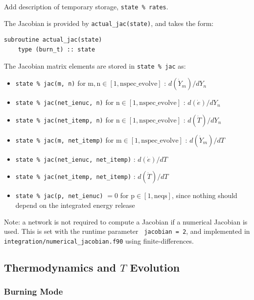 {\color{red} Add description of temporary storage, {\tt state \% rates}.}

The Jacobian is provided by {\tt actual\_jac(state)}, and takes the
form:
\begin{lstlisting}[language={[95]fortran}]
  subroutine actual_jac(state)
    type (burn_t) :: state
\end{lstlisting}
The Jacobian matrix elements are stored in {\tt state \% jac} as:
\begin{itemize}
\item {\tt state \% jac(m, n)} for $\mathrm{m}, \mathrm{n} \in [1, \mathrm{nspec\_evolve}]$ :
  $d(\dot{Y}_m)/dY_n$

\item {\tt state \% jac(net\_ienuc, n)} for $\mathrm{n} \in [1, \mathrm{nspec\_evolve}]$ :
  $d(\dot{e})/dY_n$

\item {\tt state \% jac(net\_itemp, n)} for $\mathrm{n} \in [1, \mathrm{nspec\_evolve}]$ :
  $d(\dot{T})/dY_n$

\item {\tt state \% jac(m, net\_itemp)} for $\mathrm{m} \in [1, \mathrm{nspec\_evolve}]$ :
  $d(\dot{Y}_m)/dT$

\item {\tt state \% jac(net\_ienuc, net\_itemp)} :
  $d(\dot{e})/dT$

\item {\tt state \% jac(net\_itemp, net\_itemp)} :
  $d(\dot{T})/dT$

\item {\tt state \% jac(p, net\_ienuc)} $= 0$ for $\mathrm{p} \in [1, \mathrm{neqs}]$, since nothing
  should depend on the integrated energy release 

\end{itemize}


Note: a network is not required to compute a Jacobian if a numerical
Jacobian is used.  This is set with the runtime parameter {\tt
  jacobian = 2}, and implemented in {\tt
  integration/numerical\_jacobian.f90} using finite-differences.




\subsection{Thermodynamics and $T$ Evolution}

\subsubsection{Burning Mode}

